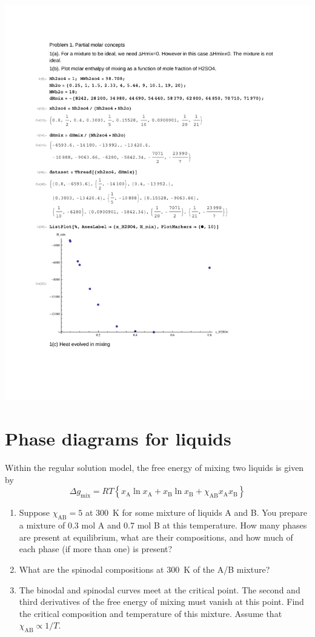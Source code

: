 \documentclass[11pt]{article}
\begin{document}
\begin{center}
\includegraphics[width=.9\linewidth]{./HW8-Q1-soln.pdf}
\end{center}


\section{Phase diagrams for liquids \label{Cp}}
\label{sec:org3932c25}
Within the regular solution model, the free  energy of mixing two liquids is given by
\begin{equation*}
  \Delta g_\text{mix} = RT \left \{ x_\text{A} \ln x_\text{A} +  x_\text{B} \ln
    x_\text{B} +\chi_\text{AB} x_\text{A}x_\text{B} \right \}
\end{equation*}
\begin{enumerate}
\item Suppose \(\chi_\text{AB} = 5\) at 300~K for some mixture of liquids A and B.  You prepare a mixture of 0.3 mol A and 0.7 mol B at this temperature.  How many phases are
present at equilibrium, what are their compositions, and how much of each phase (if more
than one) is present?

\item What are the spinodal compositions at 300~K of the A/B mixture?

\item The binodal and spinodal curves meet at the critical point.  The second and third
derivatives of the free energy of mixing must vanish at this point.  Find the critical
composition and temperature of this mixture.  Assume that \(\chi_\text{AB} \propto 1/T\).
\end{enumerate}
\end{document}
